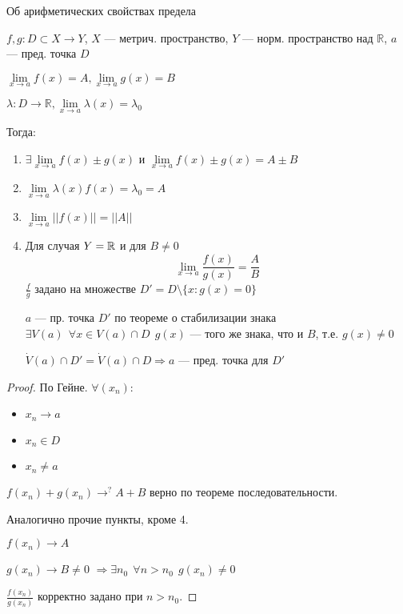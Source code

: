 \begin{theorem}
    Об арифметических свойствах предела

    $f,g: D\subset X\to Y$, $X$ --- метрич. пространство, $Y$ --- норм. пространство над $\mathbb{R}$, $a$ --- пред. точка $D$

    $\lim\limits_{x\to a}f(x)=A, \lim\limits_{x\to a}g(x)=B$
    
    $\lambda: D\to \mathbb{R}, \lim\limits_{x\to a}\lambda (x) = \lambda_0$
    
    Тогда:
    \begin{enumerate}
        \item $\exists\lim\limits_{x\to a} f(x)\pm g(x)$ и $\lim\limits_{x\to a} f(x)\pm g(x)=A\pm B$
        \item $\lim\limits_{x\to a} \lambda(x) f(x) = \lambda_0=A$
        \item $\lim\limits_{x\to a} ||f(x)||=||A||$
        \item Для случая $Y=\operatorname*{\mathbb{R}}$ и для $B\not=0$ $$\lim\limits_{x\to a}\frac{f(x)}{g(x)}=\frac{A}{B}$$
        $\frac{f}{g}$ задано на множестве $D'=D\setminus \{x:g(x)=0\}$

        $a$ --- пр. точка $D'$ по теореме о стабилизации знака $\exists V(a) \ \ \forall x\in V(a)\cap D \ \ g(x)$ --- того же знака, что и $B$, т.е. $g(x)\not = 0$

        $\dot V(a)\cap D'=\dot V(a)\cap D \Rightarrow a$ --- пред. точка для $D'$
    \end{enumerate}
\end{theorem}
\begin{proof}
    По Гейне.
    $\forall (x_n):$
    \begin{itemize}
        \itemsep0em
        \item $x_n\to a$
        \item $x_n\in D$
        \item $x_n\not=a$
    \end{itemize}

    $f(x_n) + g(x_n)\to^? A+B$ верно по теореме последовательности.

    Аналогично прочие пункты, кроме 4.

    $f(x_n)\to A$

    $g(x_n)\to B\not=0$
    $\Rightarrow \exists n_0 \ \ \forall n>n_0 \ \ g(x_n)\not=0$

    $\frac{f(x_n)}{g(x_n)}$ корректно задано при $n>n_0$.
\end{proof}
